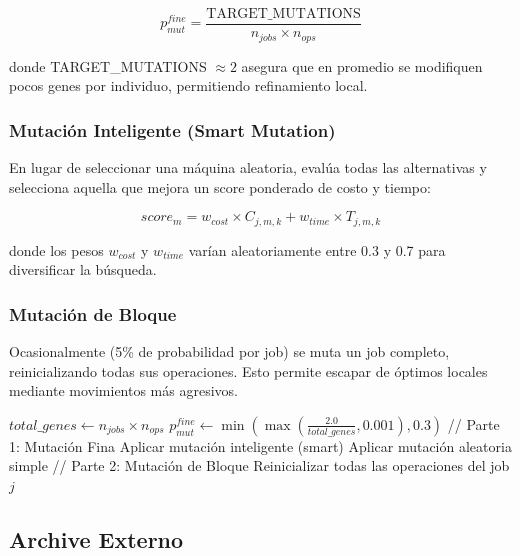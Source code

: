 \documentclass[preprint,12pt,authoryear]{elsarticle}
\begin{document}
\begin{equation}
p_{mut}^{fine} = \frac{\text{TARGET\_MUTATIONS}}{n_{jobs} \times n_{ops}}
\end{equation}

donde TARGET\_MUTATIONS $\approx 2$ asegura que en promedio se modifiquen pocos genes por individuo, permitiendo refinamiento local.

\subsubsection{Mutación Inteligente (Smart Mutation)}
En lugar de seleccionar una máquina aleatoria, evalúa todas las alternativas y selecciona aquella que mejora un score ponderado de costo y tiempo:

\begin{equation}
score_m = w_{cost} \times C_{j,m,k} + w_{time} \times T_{j,m,k}
\end{equation}

donde los pesos $w_{cost}$ y $w_{time}$ varían aleatoriamente entre 0.3 y 0.7 para diversificar la búsqueda.

\subsubsection{Mutación de Bloque}
Ocasionalmente (5\% de probabilidad por job) se muta un job completo, reinicializando todas sus operaciones. Esto permite escapar de óptimos locales mediante movimientos más agresivos.

\begin{algorithm}[h]
\caption{Mutación Híbrida Adaptativa}
\begin{algorithmic}[1]
\STATE $total\_genes \leftarrow n_{jobs} \times n_{ops}$
\STATE $p_{mut}^{fine} \leftarrow \min(\max(\frac{2.0}{total\_genes}, 0.001), 0.3)$
\STATE // Parte 1: Mutación Fina
                \STATE Aplicar mutación inteligente (smart)
            \ELSE
                \STATE Aplicar mutación aleatoria simple
            \ENDIF
        \ENDIF
    \ENDFOR
\ENDFOR
\STATE // Parte 2: Mutación de Bloque
        \STATE Reinicializar todas las operaciones del job $j$
    \ENDIF
\ENDFOR
\end{algorithmic}
\end{algorithm}

\subsection{Archive Externo}
\end{document}
